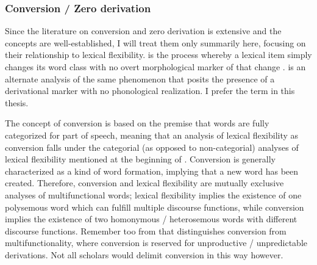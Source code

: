 \subsubsection{Conversion / Zero derivation}
\label{sec:2.3.1.7}

Since the literature on conversion and zero derivation is extensive and the concepts are well-established, I will treat them only summarily here, focusing on their relationship to lexical flexibility.  is the process whereby a lexical item simply changes its word class with no overt morphological marker of that change \parencite[114]{Crystal2008}.  is an alternate analysis of the same phenomenon that posits the presence of a derivational marker with no phonological realization. I prefer the term  in this thesis.

The concept of conversion is based on the premise that words are fully categorized for part of speech, meaning that an analysis of lexical flexibility as conversion falls under the categorial (as opposed to non-categorial) analyses of lexical flexibility mentioned at the beginning of . Conversion is generally characterized as a kind of word formation, implying that a new word has been created. Therefore, conversion and lexical flexibility are mutually exclusive analyses of multifunctional words; lexical flexibility implies the existence of one polysemous word which can fulfill multiple discourse functions, while conversion implies the existence of two homonymous / heterosemous words with different discourse functions. Remember too from  that \textcite{Lier2012} distinguishes conversion from multifunctionality, where conversion is reserved for unproductive / unpredictable derivations. Not all scholars would delimit conversion in this way however.

